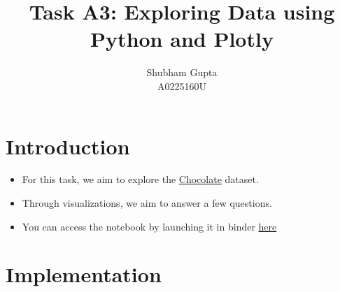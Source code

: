 \documentclass[a4paper]{article}
\title{Task A3: Exploring Data using Python and Plotly}
\author{Shubham Gupta \\ A0225160U}
\begin{document}
\maketitle
\section{Introduction}
\begin{itemize}
    \item For this task, we aim to explore the \href{https://github.com/rfordatascience/tidytuesday/tree/master/data/2022/2022-01-18}{Chocolate} dataset. 
    \item Through visualizations, we aim to answer a few questions.
    \item You can access the notebook by launching it in binder \href{https://mybinder.org/badge_logo.svg)](https://mybinder.org/v2/gh/goodhamgupta/cs5346_task_A3/HEAD?labpath=A0225160U_A3.ipynb}{here}
\end{itemize}

\section{Implementation}
\end{document}
